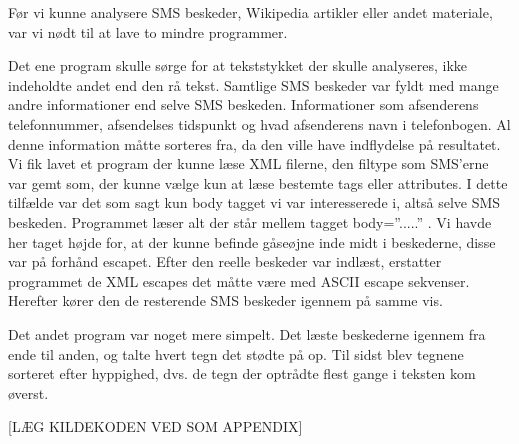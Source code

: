 Før vi kunne analysere SMS beskeder, Wikipedia artikler eller andet materiale, var vi nødt til at lave to mindre programmer.

Det ene program skulle sørge for at tekststykket der skulle analyseres, ikke indeholdte andet end den rå tekst. Samtlige SMS beskeder var fyldt med mange andre informationer end selve SMS beskeden. Informationer som afsenderens telefonnummer, afsendelses tidspunkt og hvad afsenderens navn i telefonbogen. Al denne information måtte sorteres fra, da den ville have indflydelse på resultatet. Vi fik lavet et program der kunne læse XML filerne, den filtype som SMS’erne var gemt som, der kunne vælge kun at læse bestemte tags eller attributes. I dette tilfælde var det som sagt kun body tagget vi var interesserede i, altså selve SMS beskeden. Programmet læser alt der står mellem tagget body=”.....” . Vi havde her taget højde for, at der kunne befinde gåseøjne inde midt i beskederne, disse var på forhånd escapet. Efter den reelle beskeder var indlæst, erstatter programmet de XML escapes det måtte være med ASCII escape sekvenser. Herefter kører den de resterende SMS beskeder igennem på samme vis.

Det andet program var noget mere simpelt. Det læste beskederne igennem fra ende til anden, og talte hvert tegn det stødte på op. Til sidst blev tegnene sorteret efter hyppighed, dvs. de tegn der optrådte flest gange i teksten kom øverst.

[LÆG KILDEKODEN VED SOM APPENDIX]
 
